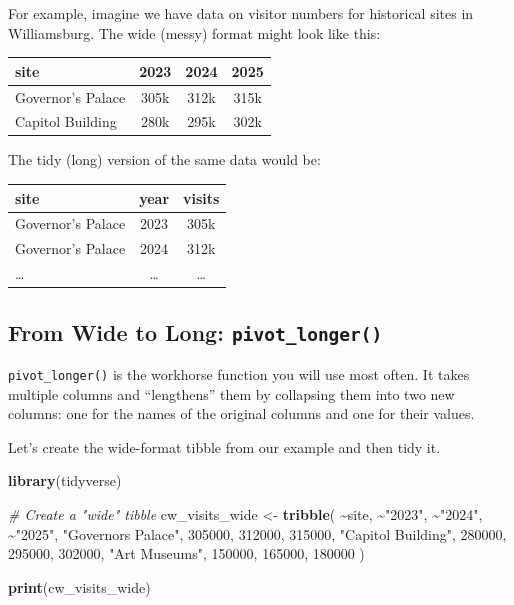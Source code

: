 \documentclass[
  11pt,
]{article}
\newenvironment{Shaded}{\begin{snugshade}}{\end{snugshade}}
\newcommand{\CommentTok}[1]{\textcolor[rgb]{0.56,0.35,0.01}{\textit{#1}}}
\newcommand{\DecValTok}[1]{\textcolor[rgb]{0.00,0.00,0.81}{#1}}
\newcommand{\FunctionTok}[1]{\textcolor[rgb]{0.13,0.29,0.53}{\textbf{#1}}}
\newcommand{\NormalTok}[1]{#1}
\newcommand{\OtherTok}[1]{\textcolor[rgb]{0.56,0.35,0.01}{#1}}
\newcommand{\SpecialCharTok}[1]{\textcolor[rgb]{0.81,0.36,0.00}{\textbf{#1}}}
\newcommand{\StringTok}[1]{\textcolor[rgb]{0.31,0.60,0.02}{#1}}
\begin{document}
For example, imagine we have data on visitor numbers for historical
sites in Williamsburg. The wide (messy) format might look like this:

\begin{longtable}[]{@{}lccc@{}}
\toprule\noalign{}
site & 2023 & 2024 & 2025 \\
\midrule\noalign{}
\endhead
\bottomrule\noalign{}
\endlastfoot
Governor's Palace & 305k & 312k & 315k \\
Capitol Building & 280k & 295k & 302k \\
\end{longtable}

The tidy (long) version of the same data would be:

\begin{longtable}[]{@{}lcc@{}}
\toprule\noalign{}
site & year & visits \\
\midrule\noalign{}
\endhead
\bottomrule\noalign{}
\endlastfoot
Governor's Palace & 2023 & 305k \\
Governor's Palace & 2024 & 312k \\
\ldots{} & \ldots{} & \ldots{} \\
\end{longtable}

\subsection{\texorpdfstring{From Wide to Long:
\texttt{pivot\_longer()}}{From Wide to Long: pivot\_longer()}}\label{from-wide-to-long-pivot_longer}

\texttt{pivot\_longer()} is the workhorse function you will use most
often. It takes multiple columns and ``lengthens'' them by collapsing
them into two new columns: one for the names of the original columns and
one for their values.

Let's create the wide-format tibble from our example and then tidy it.

\begin{Shaded}
\begin{Highlighting}[]
\FunctionTok{library}\NormalTok{(tidyverse)}

\CommentTok{\# Create a "wide" tibble}
\NormalTok{cw\_visits\_wide }\OtherTok{\textless{}{-}} \FunctionTok{tribble}\NormalTok{(}
  \SpecialCharTok{\textasciitilde{}}\NormalTok{site, }\SpecialCharTok{\textasciitilde{}}\StringTok{"2023"}\NormalTok{, }\SpecialCharTok{\textasciitilde{}}\StringTok{"2024"}\NormalTok{, }\SpecialCharTok{\textasciitilde{}}\StringTok{"2025"}\NormalTok{,}
  \StringTok{"Governor\textquotesingle{}s Palace"}\NormalTok{, }\DecValTok{305000}\NormalTok{, }\DecValTok{312000}\NormalTok{, }\DecValTok{315000}\NormalTok{,}
  \StringTok{"Capitol Building"}\NormalTok{,    }\DecValTok{280000}\NormalTok{, }\DecValTok{295000}\NormalTok{, }\DecValTok{302000}\NormalTok{,}
  \StringTok{"Art Museums"}\NormalTok{,         }\DecValTok{150000}\NormalTok{, }\DecValTok{165000}\NormalTok{, }\DecValTok{180000}
\NormalTok{)}

\FunctionTok{print}\NormalTok{(cw\_visits\_wide)}
\end{Highlighting}
\end{Shaded}
\end{document}
